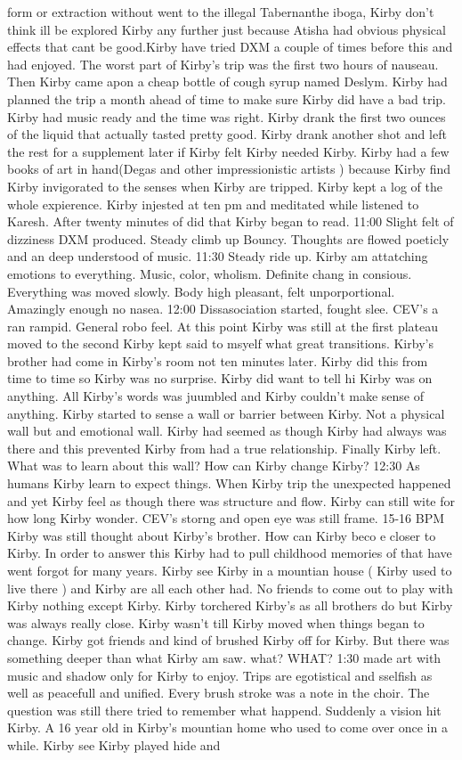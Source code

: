 \documentclass[12pt]{book}
\begin{document}
form or extraction without went to the illegal Tabernanthe iboga, Kirby don't think ill be explored Kirby any further just because Atisha had obvious physical effects that cant be good.Kirby have tried DXM a couple of times before this and had enjoyed. The worst part of Kirby's trip was the first two hours of nauseau. Then Kirby came apon a cheap bottle of cough syrup named Deslym. Kirby had planned the trip a month ahead of time to make sure Kirby did have a bad trip. Kirby had music ready and the time was right. Kirby drank the first two ounces of the liquid that actually tasted pretty good. Kirby drank another shot and left the rest for a supplement later if Kirby felt Kirby needed Kirby. Kirby had a few books of art in hand(Degas and other impressionistic artists ) because Kirby find Kirby invigorated to the senses when Kirby are tripped. Kirby kept a log of the whole expierence. Kirby injested at ten pm and meditated while listened to Karesh. After twenty minutes of did that Kirby began to read. 11:00 Slight felt of dizziness DXM produced. Steady climb up Bouncy. Thoughts are flowed poeticly and an deep understood of music. 11:30 Steady ride up. Kirby am attatching emotions to everything. Music, color, wholism. Definite chang in consious. Everything was moved slowly. Body high pleasant, felt unporportional. Amazingly enough no nasea. 12:00 Dissasociation started, fought slee. CEV's a ran rampid. General robo feel. At this point Kirby was still at the first plateau moved to the second Kirby kept said to msyelf what great transitions. Kirby's brother had come in Kirby's room not ten minutes later. Kirby did this from time to time so Kirby was no surprise. Kirby did want to tell hi Kirby was on anything. All Kirby's words was juumbled and Kirby couldn't make sense of anything. Kirby started to sense a wall or barrier between Kirby. Not a physical wall but and emotional wall. Kirby had seemed as though Kirby had always was there and this prevented Kirby from had a true relationship. Finally Kirby left. What was to learn about this wall? How can Kirby change Kirby? 12:30 As humans Kirby learn to expect things. When Kirby trip the unexpected happened and yet Kirby feel as though there was structure and flow. Kirby can still wite for how long Kirby wonder. CEV's storng and open eye was still frame. 15-16 BPM Kirby was still thought about Kirby's brother. How can Kirby beco e closer to Kirby. In order to answer this Kirby had to pull childhood memories of that have went forgot for many years. Kirby see Kirby in a mountian house ( Kirby used to live there ) and Kirby are all each other had. No friends to come out to play with Kirby nothing except Kirby. Kirby torchered Kirby's as all brothers do but Kirby was always really close. Kirby wasn't till Kirby moved when things began to change. Kirby got friends and kind of brushed Kirby off for Kirby. But there was something deeper than what Kirby am saw. what? WHAT? 1:30 made art with music and shadow only for Kirby to enjoy. Trips are egotistical and sselfish as well as peacefull and unified. Every brush stroke was a note in the choir. The question was still there tried to remember what happend. Suddenly a vision hit Kirby. A 16 year old in Kirby's mountian home who used to come over once in a while. Kirby see Kirby played hide and 
\end{document}
